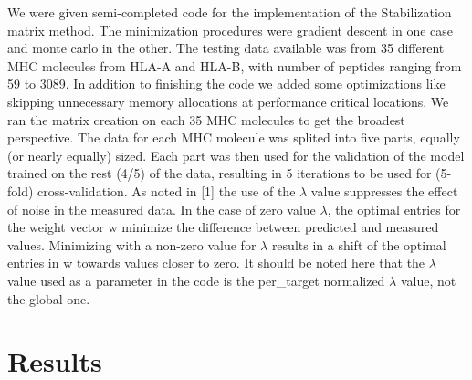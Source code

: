 \documentclass{bioinfo}
\begin{document}
\begin{application}
We were given semi-completed code for the implementation of the Stabilization matrix method. The minimization procedures were gradient descent in one case and monte carlo in the other. The testing data available was from 35 different MHC molecules from HLA-A and HLA-B, with number of peptides ranging from 59 to 3089. In addition to finishing the code we added some optimizations like skipping unnecessary memory allocations at performance critical locations. We ran the matrix creation on each 35 MHC molecules to get the broadest perspective.
The data for each MHC molecule was splited into five parts, equally (or nearly equally) sized. Each part was then used for the validation of the model trained on the rest (4/5) of the data, resulting in 5 iterations to be used for (5-fold) cross-validation.
As noted in [1] the use of the $\lambda$ value suppresses the effect of noise in the measured data. In the case of zero value $\lambda$, the optimal entries for the weight vector w minimize the difference between predicted and measured values.  Minimizing with a non-zero value for $\lambda$ results in a shift of the optimal entries in w towards values closer to zero. It should be noted here that the $\lambda$ value used as a parameter in the code is the per\_target normalized $\lambda$ value, not the global one.


\section*{Results}



\end{application}
\end{document}
